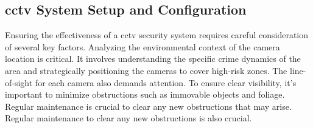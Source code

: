 \subsection{\ac{cctv} System Setup and Configuration}
Ensuring the effectiveness of a \ac{cctv} security system requires careful consideration of several key factors. Analyzing the environmental context of the camera location is critical. It involves understanding the specific crime dynamics of the area and strategically positioning the cameras to cover high-risk zones. The line-of-sight for each camera also demands attention. To ensure clear visibility, it's important to minimize obstructions such as immovable objects and foliage. Regular maintenance is crucial to clear any new obstructions that may arise. Regular maintenance to clear any new obstructions is also crucial. 

